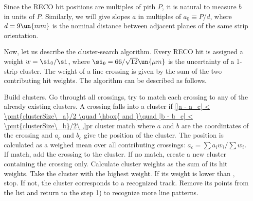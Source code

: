 Since the RECO hit positions are multiples of pith $P$, it is natural to measure $b$ in units of $P$. Similarly, we will give slopes $a$ in multiples of $a_0 \equiv P / d$, where $d = 9 \un{mm}$ is the nominal distance between adjacent planes of the same strip orientation.


Now, let us describe the cluster-search algorithm. Every RECO hit is assigned a weight $w = \si_0/\si$, where $\si_0 = 66/\sqrt{12} \un{\mu m}$ is the uncertainty of a 1-strip cluster. The weight of a line crossing is given by the sum of the two contributing hit weights. The algorithm can be described as follows.

\bitm
\itm Build clusters. Go throught all crossings, try to match each crossing to any of the already existing clusters. A crossing falls into a cluster if
\eqref{|a - a_c| < \pmt{clusterSize\_a}/2 \quad \hbox{ and }\quad |b - b_c| < \pmt{clusterSize\_b}/2\ ,}{pr cluster match}
where $a$ and $b$ are the coordintates of the crossing and $a_c$ and $b_c$ give the position of the cluster. The position is calculated as a weighed mean over all contributing crossings: $a_c = \sum a_i w_i / \sum w_i$.
If match, add the crossing to the cluster. If no match, create a new cluster containing the crossing only.
\itm Calculate cluster weights as the sum of its hit weights.
\itm Take the cluster with the highest weight. If its weight is lower than , stop. If not, the cluster corresponds to a recognized track. Remove its points from the list and return to the step 1) to recognize more line patterns.
\eitm

